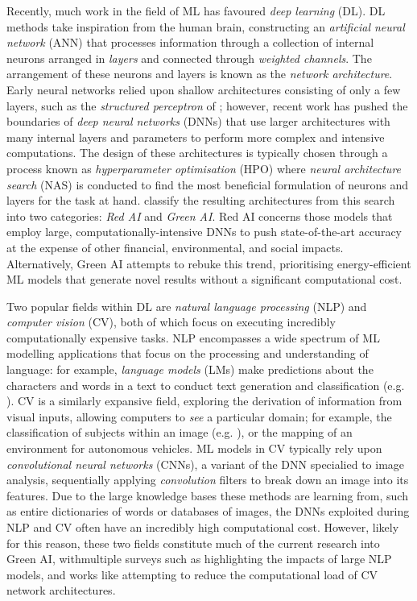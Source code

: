 \documentclass[a4paper, 12pt]{article}
\begin{document}
    Recently, much work in the field of ML has favoured \emph{deep learning} (DL). DL methods take inspiration from the human brain, constructing an \emph{artificial neural network} (ANN) that processes information through a collection of internal neurons arranged in \emph{layers} and connected through \emph{weighted channels}. The arrangement of these neurons and layers is known as the \emph{network architecture}. Early neural networks relied upon shallow architectures consisting of only a few layers, such as the \emph{structured perceptron} of \citet{mcdonald-2010}; however, recent work has pushed the boundaries of \emph{deep neural networks} (DNNs) that use larger architectures with many internal layers and parameters to perform more complex and intensive computations. The design of these architectures is typically chosen through a process known as \emph{hyperparameter optimisation} (HPO) where \emph{neural architecture search} (NAS) is conducted to find the most beneficial formulation of neurons and layers for the task at hand. \citet{schwartz-2019} classify the resulting architectures from this search into two categories: \emph{Red AI} and \emph{Green AI}. Red AI concerns those models that employ large, computationally-intensive DNNs to push state-of-the-art accuracy at the expense of other financial, environmental, and social impacts. Alternatively, Green AI attempts to rebuke this trend, prioritising energy-efficient ML models that generate novel results without a significant computational cost. 

    Two popular fields within DL are \emph{natural language processing} (NLP) and \emph{computer vision} (CV), both of which focus on executing incredibly computationally expensive tasks. NLP encompasses a wide spectrum of ML modelling applications that focus on the processing and understanding of language: for example, \emph{language models} (LMs) make predictions about the characters and words in a text to conduct text generation and classification (e.g. \citet{cer-2018}). CV is a similarly expansive field, exploring the derivation of information from visual inputs, allowing computers to \emph{see} a particular domain; for example, the classification of subjects within an image (e.g. \citet{mahajan-2018}), or the mapping of an environment for autonomous vehicles. ML models in CV typically rely upon \emph{convolutional neural networks} (CNNs), a variant of the DNN specialied to image analysis, sequentially applying \emph{convolution} filters to break down an image into its features. Due to the large knowledge bases these methods are learning from, such as entire dictionaries of words or databases of images, the DNNs exploited during NLP and CV often have an incredibly high computational cost. However, likely for this reason, these two fields constitute much of the current research into Green AI, withmultiple surveys such as \citet{bender-2021} highlighting the impacts of large NLP models, and works like \citet{iandola-2016} attempting to reduce the computational load of CV network architectures. 
    
\end{document}
